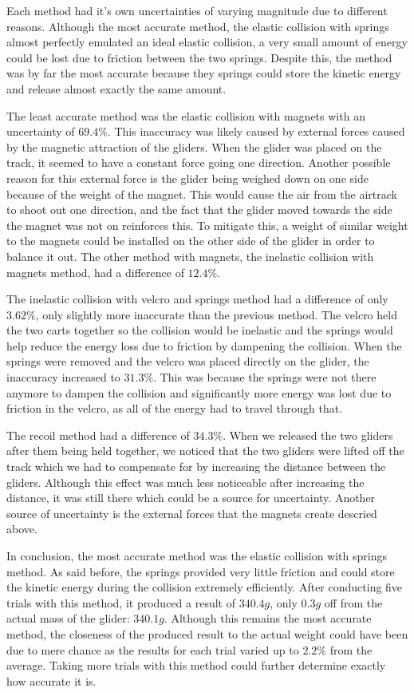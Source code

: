 \documentclass[12pt]{article}
\begin{document}
Each method had it's own uncertainties of varying magnitude due to different reasons. Although the most accurate method, the elastic collision with springs almost perfectly emulated an ideal elastic collision, a very small amount of energy could be lost due to friction between the two springs. Despite this, the method was by far the most accurate because they springs could store the kinetic energy and release almost exactly the same amount.

The least accurate method was the elastic collision with magnets with an uncertainty of $69.4\%$. This inaccuracy was likely caused by external forces caused by the magnetic attraction of the gliders. When the glider was placed on the track, it seemed to have a constant force going one direction. Another possible reason for this external force is the glider being weighed down on one side because of the weight of the magnet. This would cause the air from the airtrack to shoot out one direction, and the fact that the glider moved towards the side the magnet was not on reinforces this. To mitigate this, a weight of similar weight to the magnets could be installed on the other side of the glider in order to balance it out. The other method with magnets, the inelastic collision with magnets method, had a difference of $12.4\%$.

The inelastic collision with velcro and springs method had a difference of only $3.62\%$, only slightly more inaccurate than the previous method. The velcro held the two carts together so the collision would be inelastic and the springs would help reduce the energy loss due to friction by dampening the collision. When the springs were removed and the velcro was placed directly on the glider, the inaccuracy increased to $31.3\%$. This was because the springs were not there anymore to dampen the collision and significantly more energy was lost due to friction in the velcro, as all of the energy had to travel through that.

The recoil method had a difference of $34.3\%$. When we released the two gliders after them being held together, we noticed that the two gliders were lifted off the track which we had to compensate for by increasing the distance between the gliders. Although this effect was much less noticeable after increasing the distance, it was still there which could be a source for uncertainty. Another source of uncertainty is the external forces that the magnets create descried above.

In conclusion, the most accurate method was the elastic collision with springs method. As said before, the springs provided very little friction and could store the kinetic energy during the collision extremely efficiently. After conducting five trials with this method, it produced a result of $340.4g$, only $0.3g$ off from the actual mass of the glider: $340.1g$. Although this remains the most accurate method, the closeness of the produced result to the actual weight could have been due to mere chance as the results for each trial varied up to $2.2\%$ from the average. Taking more trials with this method could further determine exactly how accurate it is. 
\newpage
\appendix
\singlespacing
\end{document}
